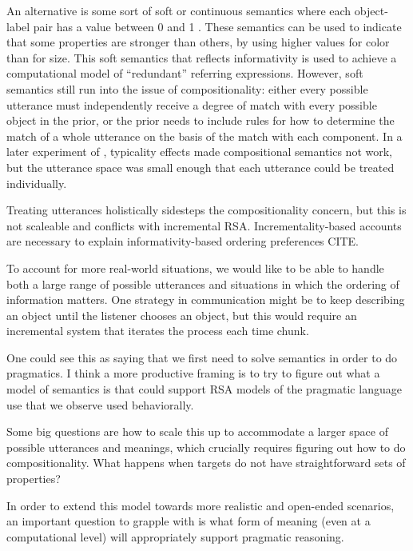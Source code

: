 \documentclass[]{article}
\begin{document}
An alternative is some sort of soft or continuous semantics where each object-label pair has a value between 0 and 1 \cite{degen20200406}. These semantics can be used to indicate that some properties are stronger than others, by using higher values for color than for size. This soft semantics that reflects informativity is used to achieve a computational model of ``redundant'' referring expressions. %
However, soft semantics still run into the issue of compositionality: either every possible utterance must independently receive a degree of match with every possible object in the prior, or the prior needs to include rules for how to determine the match of a whole utterance on the basis of the match with each component. 
In a later experiment of \cite{degen20200406}, typicality effects made compositional semantics not work, but the utterance space was small enough that each utterance could be treated individually. 

Treating utterances holistically sidesteps the compositionality concern, but this is not scaleable and conflicts with incremental RSA. Incrementality-based accounts are necessary to explain informativity-based ordering preferences CITE. 

To account for more real-world situations, we would like to be able to handle both a large range of possible utterances and situations in which the ordering of information matters. One strategy in communication might be to keep describing an object until the listener chooses an object, but this would require an incremental system that iterates the process each time chunk.

One could see this as saying that we first need to solve semantics in order to do pragmatics. I think a more productive framing is to try to figure out what a model of semantics is that could support RSA models of the pragmatic language use that we observe used behaviorally. 


Some big questions are how to scale this up to accommodate a larger space of possible utterances and meanings, which crucially requires figuring out how to do compositionality. What happens when targets do not have straightforward sets of properties? 



 In order to extend this model towards more realistic and open-ended scenarios, an important question to grapple with is what form of meaning (even at a computational level) will appropriately support pragmatic reasoning. 
\end{document}
